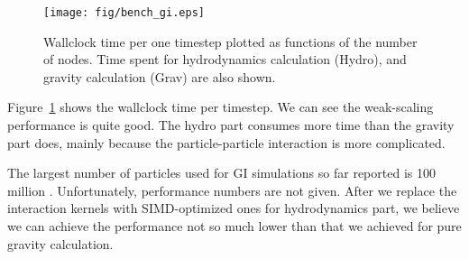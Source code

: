 \begin{figure}
  \begin{center}
    \texttt{[image: fig/bench\_gi.eps]}
  \end{center}
  \caption{Wallclock time per one timestep plotted as functions of the
    number of nodes. Time spent for hydrodynamics calculation (Hydro),
    and gravity calculation (Grav) are also shown.}
  \label{fig:benchGI}
\end{figure}

Figure~\ref{fig:benchGI} shows the wallclock time per timestep. We
can see the weak-scaling performance is quite good. The hydro part
consumes more time than the gravity part does, mainly because the
particle-particle interaction is more complicated.

The largest number of particles used for GI simulations so far
reported is 100 million \cite{2014LPI....45.2703T}. Unfortunately,
performance numbers are not given. After we replace the interaction
kernels with SIMD-optimized ones for hydrodynamics part, we believe we
can achieve the performance not so much lower than that we achieved
for pure gravity calculation.


